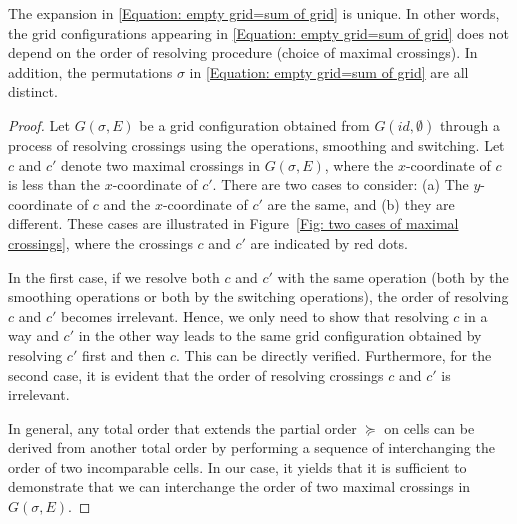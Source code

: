 \begin{prop} \label{prop:well-def}
  The expansion in \eqref{Equation: empty grid=sum of grid} is unique.
  In other words, the grid configurations appearing in
  \eqref{Equation: empty grid=sum of grid} does not depend on
  the order of resolving procedure (choice of maximal crossings).
  In addition, the permutations $\sigma$ in
  \eqref{Equation: empty grid=sum of grid} are all distinct. 
\end{prop}
\begin{proof}
  Let \( G(\sigma,E) \) be a grid configuration obtained from $G(id,\emptyset)$
  through a process of resolving crossings using the operations, smoothing and
  switching.
  Let \( c \) and \( c' \) denote two maximal crossings in $G(\sigma,E)$,
  where the $x$-coordinate of $c$ is less than the $x$-coordinate of $c'$.
  There are two cases to consider: (a) The $y$-coordinate of $c$ and the $x$-coordinate of $c'$
  are the same, and (b) they are different.
  These cases are illustrated in Figure~\ref{Fig: two cases of maximal crossings},
  where the crossings $c$ and $c'$ are indicated by red dots.

  In the first case, if we resolve both $c$ and $c'$ with the same operation
  (both by the smoothing operations or both by the switching operations),
  the order of resolving $c$ and $c'$
  becomes irrelevant. Hence, we only need to show that resolving $c$ in a way and
  $c'$ in the other way leads to the same grid configuration obtained by resolving
  $c'$ first and then $c$. This can be directly verified.
  Furthermore, for the second case, it is evident that the order of resolving
  crossings $c$ and $c'$ is irrelevant.

  In general, any total order that extends the partial order  \( \succeq \) on
  cells can be derived from another total order by performing a sequence of
  interchanging the order of two incomparable cells.
  In our case, it yields that it is sufficient to demonstrate that we can
  interchange the order of two maximal crossings in \( G(\sigma,E) \).
  

\end{proof}
